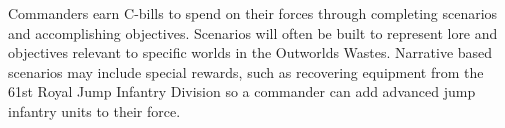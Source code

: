 Commanders earn C-bills to spend on their forces through completing scenarios and accomplishing objectives.
Scenarios will often be built to represent lore and objectives relevant to specific worlds in the Outworlds Wastes.
Narrative based scenarios may include special rewards, such as recovering equipment from the 61st Royal Jump Infantry Division so a commander can add advanced jump infantry units to their force.
